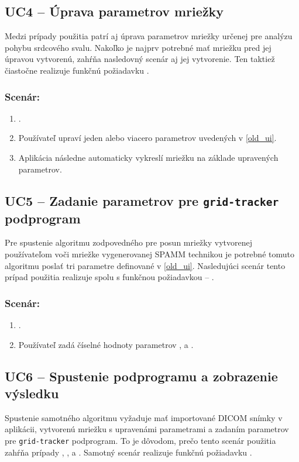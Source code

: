 {\subsection {UC4 -- Úprava parametrov mriežky}\label{uc4}
Medzi prípady použitia patrí aj úprava parametrov mriežky určenej pre analýzu pohybu srdcového svalu. Nakoľko je najprv potrebné mať mriežku  pred jej úpravou vytvorenú, zahŕňa nasledovný scenár aj jej vytvorenie. Ten taktiež čiastočne realizuje funkčnú požiadavku .

\subsubsection*{Scenár:}
\begin {enumerate}
\item {.}
\item {Používateľ upraví jeden alebo viacero parametrov uvedených v \ref{old_ui}.}
\item {Aplikácia následne automaticky vykreslí mriežku na základe upravených parametrov.}
\end {enumerate}

\subsection {UC5 -- Zadanie parametrov pre \texttt{grid-tracker} podprogram}\label{uc5}
Pre spustenie algoritmu zodpovedného pre posun mriežky vytvorenej používateľom voči mriežke vygenerovanej SPAMM technikou je potrebné tomuto algoritmu poslať tri parametre definované v \ref{old_ui}. Nasledujúci scenár tento prípad použitia realizuje spolu s funkčnou požiadavkou -- .

\subsubsection*{Scenár:}
\begin {enumerate}
\item {.}
\item {Používateľ zadá číselné hodnoty parametrov ,  a .}
\end {enumerate}

\subsection {UC6 -- Spustenie podprogramu a zobrazenie výsledku}
Spustenie samotného algoritmu vyžaduje mať importované DICOM snímky v aplikácii, vytvorenú mriežku s upravenámi parametrami a zadaním parametrov pre \texttt{grid-tracker} podprogram. To je dôvodom, prečo tento scenár použitia zahŕňa prípady , ,  a . Samotný scenár realizuje funkčnú požiadavku .

}
